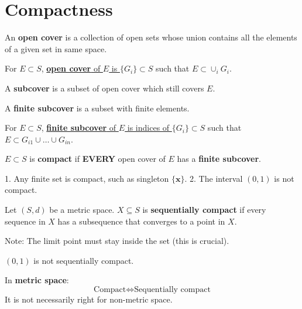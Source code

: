 \section{Compactness}


\begin{definition}
    An \textbf{open cover} is a collection of open sets whose union contains all the elements of a given set in same space.

    For $E \subset S$, \underline{\textbf{open cover} of $E$ is $\{G_i\} \subset S$} such that $E \subset \cup_i G_i$.
\end{definition}



\begin{definition}[Subcover]
    A \textbf{subcover} is a subset of open cover which still covers $E$.
\end{definition}


\begin{definition}
    A \textbf{finite subcover} is a subset with finite elements.

    For $E \subset S$, \underline{\textbf{finite subcover} of $E$ is indices of $\{G_{i}\} \subset S$} such that $E \subset G_{i1}  \cup \dots \cup G_{in}$.
\end{definition}


\begin{definition}
    $E \subset S$ is \textbf{compact} if \textbf{EVERY} open cover of $E$ has a \textbf{finite subcover}.
\end{definition}

\begin{example*}
    1. Any finite set is compact, such as singleton $\{\mathbf{x}\}$. 2. The interval $(0,1)$ is not compact.
\end{example*}

\begin{definition}
    Let $(S,d)$ be a metric space. $X \subseteq S$ is \textbf{sequentially compact} if every sequence in $X$ has a subsequence that converges to a point in $X$.

    Note: The limit point must stay inside the set (this is crucial).
    \begin{example*}
        $(0,1)$ is not sequentially compact.
    \end{example*}
\end{definition}

\begin{proposition}
    In \textbf{metric space}: \begin{equation*}
        \text{Compact} \iff \text{Sequentially compact}
    \end{equation*}
    It is not necessarily right for non-metric space.
\end{proposition}

